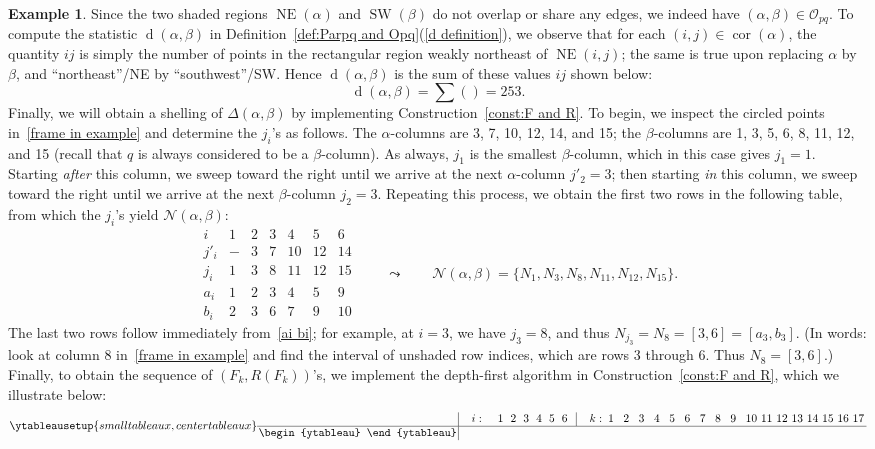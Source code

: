 \documentclass[noamsfonts,10pt]{amsart}
\newcommand{\NN}{\mathcal{N}}
\newcommand{\al}{\alpha}
\newcommand{\be}{\beta}
\renewcommand{\O}{\mathcal{O}}
\newcommand{\NE}[1]{\operatorname{NE}(#1)}
\newcommand{\SW}[1]{\operatorname{SW}(#1)}
\renewcommand{\d}{\operatorname{d}}
\DeclareMathOperator{\cor}{cor}
\newcommand{\1}{\mathbf{1}}
\theoremstyle{plain}
\theoremstyle{definition}
\newtheorem{example}[theorem]{Example}
\numberwithin{equation}{section}
\begin{document}
\begin{example}
    \noindent Since the two shaded regions $\NE{\al}$ and $\SW{\be}$ do not overlap or share any edges, we indeed have $(\al,\be) \in \O_{pq}$.
    To compute the statistic $\d(\al,\be)$ in Definition~\ref{def:Parpq and Opq}(\ref{d definition}), we observe that for each $(i,j) \in \cor(\al)$, the quantity $ij$ is simply the number of points in the rectangular region weakly northeast of $\NE{i,j}$;
    the same is true upon replacing $\al$ by $\be$, and ``northeast''/NE by ``southwest''/SW.
    Hence $\d(\al,\be)$ is the sum of these values $ij$ shown below:
    \[
        \d(\al,\be) = 
        \sum 
        \left(
        
        \right) = 253.
    \]
    Finally, we will obtain a shelling of $\Delta(\al,\be)$ by implementing Construction~\ref{const:F and R}.
    To begin, we inspect the circled points in~\eqref{frame in example} and determine the $j_i$'s as follows.
    The $\al$-columns are 3, 7, 10, 12, 14, and 15;
    the $\be$-columns are 1, 3, 5, 6, 8, 11, 12, and 15 (recall that $q$ is always considered to be a $\be$-column).
    As always, $j_1$ is the smallest $\be$-column, which in this case gives $j_1 = 1$.
    Starting \emph{after} this column, we sweep toward the right until we arrive at the next $\al$-column $j'_2 = 3$;
    then starting \emph{in} this column, we sweep toward the right until we arrive at the next $\be$-column $j_2 = 3$.
    Repeating this process, we obtain the first two rows in the following table, from which the $j_i$'s yield $\NN(\al,\be)$:
    \[
        \begin{array}{c|cccccc}
            i & 1 & 2 & 3 & 4 & 5 & 6 \\ \hline
            j'_i & - & 3 & 7 & 10 & 12 & 14 \\ 
            j_i & 1 & 3 & 8 & 11 & 12 & 15 \\ \hline
            a_i & 1 & 2 & 3 & 4 & 5 & 9 \\
            b_i & 2 & 3 & 6 & 7 & 9 & 10
        \end{array}
        \qquad \leadsto \qquad
        \NN(\al,\be) = \{N_1, N_3, N_8, N_{11}, N_{12}, N_{15} \}.
    \]
    The last two rows follow immediately from~\eqref{ai bi}; for example, at $i=3$, we have $j_3 = 8$, and thus $N_{j_3} = N_8 = [3,6] = [a_3, b_3]$.
    (In words: look at column 8 in~\eqref{frame in example} and find the interval of unshaded row indices, which are rows 3 through 6.
    Thus $N_8 = [3,6]$.)
    Finally, to obtain the sequence of $(F_k, R(F_k))$'s, we implement the depth-first algorithm in Construction~\ref{const:F and R}, which we illustrate below:
    \[
    \ytableausetup{smalltableaux,centertableaux}
    \arraycolsep=1.3pt
        \begin{array}{c|rp{2ex}p{2ex}p{2ex}p{2ex}p{2ex}p{2ex}p{2ex}c|rcp{2.5ex}p{2.5ex}p{2.5ex}p{2.5ex}p{2.5ex}p{2.5ex}p{2.5ex}p{2.5ex}p{2.5ex}p{2.5ex}p{2.5ex}p{2.5ex}p{2.5ex}p{2.5ex}p{2.5ex}p{2.5ex}p{2.5ex}p{2.5ex}}
          \quad & \quad i: & & 1 & 2 & 3 & 4 & 5 & 6 & & \quad k: & & 1 & 2 & 3 & 4 & 5 & 6 & 7 & 8 & 9 & 10 & 11 & 12 & 13 & 14 & 15 & 16 & 17 \\ \hline
           \begin{ytableau}


\end{ytableau}
\end{array}\]
\end{example}
\end{document}
